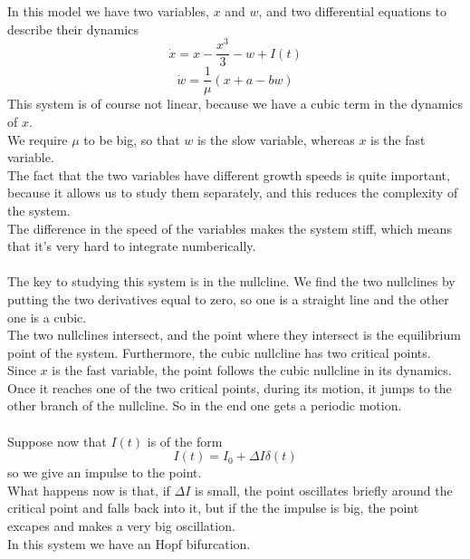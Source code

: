 In this model we have two variables, $x$ and $w$, and two differential equations to describe their dynamics
$$
	\dot{x} = x - \frac{x^3}{3} - w + I(t)
$$
$$
	\dot{w} = \frac{1}{\mu}(x+a-bw)
$$
This system is of course not linear, because we have a cubic term in the dynamics of $x$. \\
We require $\mu$ to be big, so that $w$ is the slow variable, whereas $x$ is the fast variable. \\
The fact that the two variables have different growth speeds is quite important, because it allows us to study them separately, and this reduces the complexity of the system. \\
The difference in the speed of the variables makes the system stiff, which means that it's very hard to integrate numberically. \\ \\
The key to studying this system is in the nullcline. We find the two nullclines by putting the two derivatives equal to zero, so one is a straight line and the other one is a cubic. \\
The two nullclines intersect, and the point where they intersect is the equilibrium point of the system. Furthermore, the cubic nullcline has two critical points. Since $x$ is the fast variable, the point follows the cubic nullcline in its dynamics. Once it reaches one of the two critical points, during its motion, it jumps to the other branch of the nullcline. So in the end one gets a periodic motion. \\ \\
Suppose now that $I(t)$ is of the form
$$
	I(t) = I_0 + \Delta I \delta(t)
$$	
so we give an impulse to the point. \\
What happens now is that, if $\Delta I$ is small, the point oscillates briefly around the critical point and falls back into it, but if the the impulse is big, the point excapes and makes a very big oscillation. \\
In this system we have an Hopf bifurcation. \\